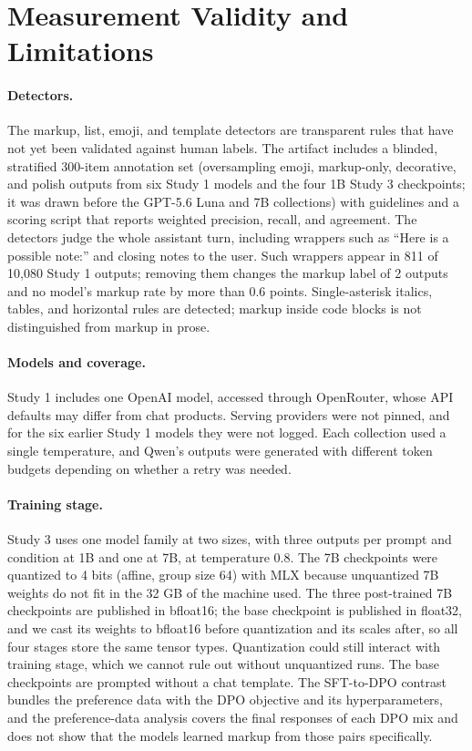 \documentclass[acmsmall,screen,review,anonymous]{acmart}
\begin{document}


\section{Measurement Validity and Limitations}
\label{sec:validity}

\paragraph{Detectors.} The markup, list, emoji, and template detectors are transparent rules that have not yet been validated against human labels. The artifact includes a blinded, stratified 300-item annotation set (oversampling emoji, markup-only, decorative, and polish outputs from six Study 1 models and the four 1B Study 3 checkpoints; it was drawn before the GPT-5.6 Luna and 7B collections) with guidelines and a scoring script that reports weighted precision, recall, and agreement. The detectors judge the whole assistant turn, including wrappers such as ``Here is a possible note:'' and closing notes to the user. Such wrappers appear in 811 of 10,080 Study 1 outputs; removing them changes the markup label of 2 outputs and no model's markup rate by more than 0.6 points. Single-asterisk italics, tables, and horizontal rules are detected; markup inside code blocks is not distinguished from markup in prose.

\paragraph{Models and coverage.} Study 1 includes one OpenAI model, accessed through OpenRouter, whose API defaults may differ from chat products. Serving providers were not pinned, and for the six earlier Study 1 models they were not logged. Each collection used a single temperature, and Qwen's outputs were generated with different token budgets depending on whether a retry was needed.

\paragraph{Training stage.} Study 3 uses one model family at two sizes, with three outputs per prompt and condition at 1B and one at 7B, at temperature 0.8. The 7B checkpoints were quantized to 4 bits (affine, group size 64) with MLX because unquantized 7B weights do not fit in the 32 GB of the machine used. The three post-trained 7B checkpoints are published in bfloat16; the base checkpoint is published in float32, and we cast its weights to bfloat16 before quantization and its scales after, so all four stages store the same tensor types. Quantization could still interact with training stage, which we cannot rule out without unquantized runs. The base checkpoints are prompted without a chat template. The SFT-to-DPO contrast bundles the preference data with the DPO objective and its hyperparameters, and the preference-data analysis covers the final responses of each DPO mix and does not show that the models learned markup from those pairs specifically.
\end{document}
